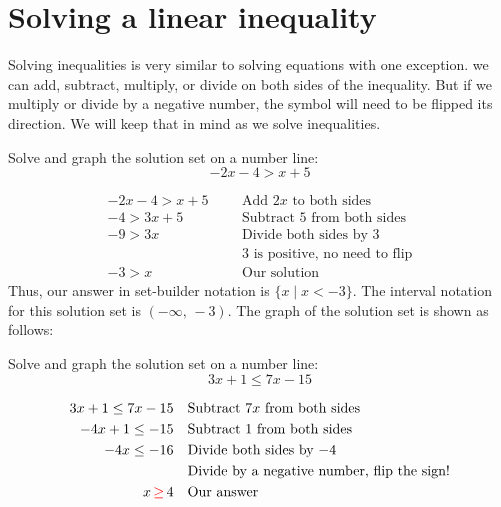 \section{Solving a linear inequality}
Solving inequalities is very similar to solving equations with one exception.  we can add, subtract, multiply, or divide on
both sides of the inequality. But if we multiply or divide by a negative number, the symbol will need to be flipped its direction. We will keep that in mind as we solve
inequalities.
\begin{exa}
    Solve and graph the solution set on a number line:
    \begin{equation*}
            -2x-4 > x+5
    \end{equation*}
\end{exa}
\begin{align*}
    -2x-4 > x+5&    &   &\text{Add $2x$ to both sides}\\
    -4 > 3x+5&  &   &\text{Subtract 5 from both sides}\\
    -9 > 3x&    &   &\text{Divide both sides by 3}\\
    &   &           &\text{3 is positive, no need to flip}\\
    -3>x&   &   &\text{Our solution}
\end{align*}
Thus, our answer in set-builder notation is $\{x \mid x<-3\}$. The interval notation for this solution set is $(-\infty,\,-3)$. The graph of the solution set is shown as follows:
    \begin{center}
    \end{center}
\vspace{0.4cm}
\begin{exa}
    Solve and graph the solution set on a number line:
    \begin{equation*}
        3x+1 \le 7x-15
    \end{equation*}
\end{exa}
\begin{align*}
    3x+1 \le 7x-15& &   &\text{Subtract $7x$ from both sides}\\
    -4x+1 \le -15&  &   &\text{Subtract 1 from both sides}\\
    -4x \le -16&    &   &\text{Divide both sides by $-4$}\\
    &   &   &\text{Divide by a negative number, flip the sign!}\\
    x\,\textcolor{red}{ \ge }\,4&   &   &\text{Our answer}
\end{align*}

